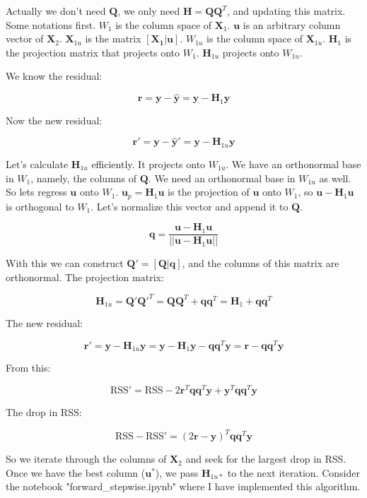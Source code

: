 \documentclass{article}
\begin{document}
Actually we don't need $\mathbf{Q}$, we only need $\mathbf{H}= \mathbf{Q}\mathbf{Q}^T$, and updating this matrix. Some notations first. $W_1$ is the column space of $\mathbf{X}_1$. $\mathbf{u}$ is an arbitrary column vector of $\mathbf{X}_2$. $\mathbf{X}_{1u}$ is the matrix $[\mathbf{X_1} | \mathbf{u}]$. $W_{1u}$ is the column space of $\mathbf{X}_{1u}$. $\mathbf{H}_1$ is the projection matrix that projects onto $W_1$. $\mathbf{H}_{1u}$ projects onto $W_{1u}$.

We know the residual:

\[
\mathbf{r} = \mathbf{y} - \mathbf{\hat{y}} = \mathbf{y} - \mathbf{H}_1 \mathbf{y}
\]

Now the new residual:

\[
\mathbf{r}'  = \mathbf{y} - \mathbf{\hat{y}}' = \mathbf{y} - \mathbf{H}_{1u}\mathbf{y}
\]

Let's calculate $\mathbf{H}_{1u}$ efficiently. It projects onto $W_{1u}$. We have an orthonormal base in $W_1$, namely, the columns of $\mathbf{Q}$. We need an orthonormal base in $W_{1u}$ as well. So lets regress $\mathbf{u}$ onto $W_1$. $\mathbf{u}_p = \mathbf{H}_1 \mathbf{u}$ is the projection of $\mathbf{u}$ onto $W_1$, so $\mathbf{u} - \mathbf{H}_1 \mathbf{u}$ is orthogonal to $W_1$. Let's normalize this vector and append it to $\mathbf{Q}$.

\[
    \mathbf{q} = \frac{\mathbf{u} - \mathbf{H}_1 \mathbf{u}}{|| \mathbf{u} - \mathbf{H}_1 \mathbf{u} ||}
\]

With this we can construct $\mathbf{Q}' = [\mathbf{Q} | \mathbf{q}]$, and the columns of this matrix are orthonormal. The projection matrix:

\[
\mathbf{H}_{1u} = \mathbf{Q}'\mathbf{Q}'^T = \mathbf{Q}\mathbf{Q}^T + \mathbf{q}\mathbf{q}^T = \mathbf{H}_1 + \mathbf{q}\mathbf{q}^T
\]

The new residual:

\[
\mathbf{r}' = \mathbf{y} - \mathbf{H}_{1u}\mathbf{y} = \mathbf{y} - \mathbf{H}_1 \mathbf{y} - \mathbf{q}\mathbf{q}^T\mathbf{y} = \mathbf{r} - \mathbf{q}\mathbf{q}^T\mathbf{y}
\]

From this:

\[
\text{RSS}' = \text{RSS} -2\mathbf{r}^T \mathbf{q}\mathbf{q}^T \mathbf{y} + \mathbf{y}^T\mathbf{q}\mathbf{q}^T\mathbf{y}
\]

The drop in RSS:

\[
\text{RSS} - \text{RSS}' = (2\mathbf{r} - \mathbf{y})^T\mathbf{q}\mathbf{q}^T\mathbf{y}
\]

So we iterate through the columns of $\mathbf{X}_2$ and seek for the largest drop in RSS. Once we have the best column ($\mathbf{u}^{*}$), we pass $\mathbf{H}_{1u*}$ to the next iteration. Consider the notebook "forward\_stepwise.ipynb" where I have implemented this algorithm.
\end{document}
